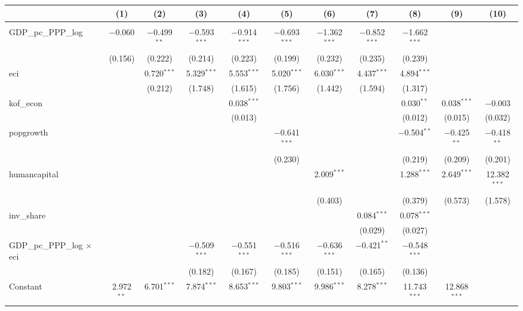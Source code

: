 
\begin{tabular}{@{\hspace{5pt}}l@{\hspace{5pt}}cccccccccc} 
\toprule 
 & (1) & (2) & (3) & (4) & (5) & (6) & (7) & (8) & (9) & (10)\\ 
\midrule  
\\[-2.1ex] GDP\_pc\_PPP\_log & $-$0.060 & $-$0.499$^{**}$ & $-$0.593$^{***}$ & $-$0.914$^{***}$ & $-$0.693$^{***}$ & $-$1.362$^{***}$ & $-$0.852$^{***}$ & $-$1.662$^{***}$ &  &  \\ 
  & (0.156) & (0.222) & (0.214) & (0.223) & (0.199) & (0.232) & (0.235) & (0.239) &  &  \\ 
 \addlinespace 
 eci &  & 0.720$^{***}$ & 5.329$^{***}$ & 5.553$^{***}$ & 5.020$^{***}$ & 6.030$^{***}$ & 4.437$^{***}$ & 4.894$^{***}$ &  &  \\ 
  &  & (0.212) & (1.748) & (1.615) & (1.756) & (1.442) & (1.594) & (1.317) &  &  \\ 
 \addlinespace 
 kof\_econ &  &  &  & 0.038$^{***}$ &  &  &  & 0.030$^{**}$ & 0.038$^{***}$ & $-$0.003 \\ 
  &  &  &  & (0.013) &  &  &  & (0.012) & (0.015) & (0.032) \\ 
 \addlinespace 
 popgrowth &  &  &  &  & $-$0.641$^{***}$ &  &  & $-$0.504$^{**}$ & $-$0.425$^{**}$ & $-$0.418$^{**}$ \\ 
  &  &  &  &  & (0.230) &  &  & (0.219) & (0.209) & (0.201) \\ 
 \addlinespace 
 humancapital &  &  &  &  &  & 2.009$^{***}$ &  & 1.288$^{***}$ & 2.649$^{***}$ & 12.382$^{***}$ \\ 
  &  &  &  &  &  & (0.403) &  & (0.379) & (0.573) & (1.578) \\ 
 \addlinespace 
 inv\_share &  &  &  &  &  &  & 0.084$^{***}$ & 0.078$^{***}$ &  &  \\ 
  &  &  &  &  &  &  & (0.029) & (0.027) &  &  \\ 
 \addlinespace 
 GDP\_pc\_PPP\_log $\times$ eci &  &  & $-$0.509$^{***}$ & $-$0.551$^{***}$ & $-$0.516$^{***}$ & $-$0.636$^{***}$ & $-$0.421$^{**}$ & $-$0.548$^{***}$ &  &  \\ 
  &  &  & (0.182) & (0.167) & (0.185) & (0.151) & (0.165) & (0.136) &  &  \\ 
 \addlinespace 
 Constant & 2.972$^{**}$ & 6.701$^{***}$ & 7.874$^{***}$ & 8.653$^{***}$ & 9.803$^{***}$ & 9.986$^{***}$ & 8.278$^{***}$ & 11.743$^{***}$ & 12.868$^{***}$ &  \\ 

\end{tabular}
